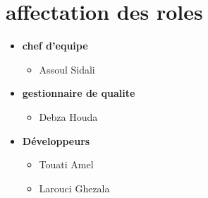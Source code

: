 \documentclass[11pt,fleqn]{book} %
\begin{document}
\section{affectation des roles}
\begin{itemize}
    \item \textbf{chef d'equipe}
    \begin{itemize}
        \item Assoul Sidali
    \end{itemize}
    \item \textbf{gestionnaire de qualite}
    \begin{itemize}
        \item Debza Houda
    \end{itemize}
    \item \textbf{Développeurs}
    \begin{itemize}
        \item Touati Amel
        \item Larouci Ghezala
    \end{itemize}
\end{itemize}
\end{document}
